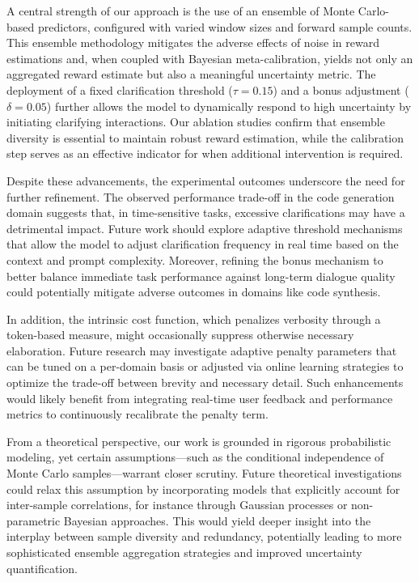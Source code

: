 \documentclass{article} %
\begin{document}
A central strength of our approach is the use of an ensemble of Monte Carlo-based predictors, configured with varied window sizes and forward sample counts. This ensemble methodology mitigates the adverse effects of noise in reward estimations and, when coupled with Bayesian meta-calibration, yields not only an aggregated reward estimate but also a meaningful uncertainty metric. The deployment of a fixed clarification threshold (\(\tau = 0.15\)) and a bonus adjustment (\(\delta = 0.05\)) further allows the model to dynamically respond to high uncertainty by initiating clarifying interactions. Our ablation studies confirm that ensemble diversity is essential to maintain robust reward estimation, while the calibration step serves as an effective indicator for when additional intervention is required.

Despite these advancements, the experimental outcomes underscore the need for further refinement. The observed performance trade-off in the code generation domain suggests that, in time-sensitive tasks, excessive clarifications may have a detrimental impact. Future work should explore adaptive threshold mechanisms that allow the model to adjust clarification frequency in real time based on the context and prompt complexity. Moreover, refining the bonus mechanism to better balance immediate task performance against long-term dialogue quality could potentially mitigate adverse outcomes in domains like code synthesis.

In addition, the intrinsic cost function, which penalizes verbosity through a token-based measure, might occasionally suppress otherwise necessary elaboration. Future research may investigate adaptive penalty parameters that can be tuned on a per-domain basis or adjusted via online learning strategies to optimize the trade-off between brevity and necessary detail. Such enhancements would likely benefit from integrating real-time user feedback and performance metrics to continuously recalibrate the penalty term.

From a theoretical perspective, our work is grounded in rigorous probabilistic modeling, yet certain assumptions—such as the conditional independence of Monte Carlo samples—warrant closer scrutiny. Future theoretical investigations could relax this assumption by incorporating models that explicitly account for inter-sample correlations, for instance through Gaussian processes or non-parametric Bayesian approaches. This would yield deeper insight into the interplay between sample diversity and redundancy, potentially leading to more sophisticated ensemble aggregation strategies and improved uncertainty quantification.
\end{document}
